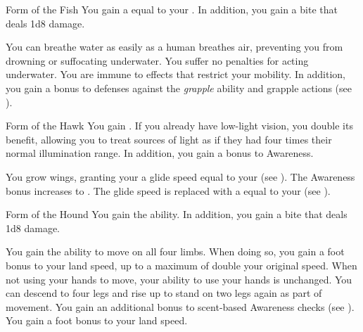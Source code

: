 {            \begin{freeability}{Form of the Fish}
                You gain a  equal to your .
                In addition, you gain a bite  that deals 1d8 damage.

                \rankline
                 You can breathe water as easily as a human breathes air, preventing you from drowning or suffocating underwater.
                 You suffer no penalties for acting underwater.
                 You are immune to  effects that restrict your mobility.
                In addition, you gain a  bonus to defenses against the \textit{grapple} ability and grapple actions (see ).
            \end{freeability}

            \begin{freeability}{Form of the Hawk}
                You gain .
                If you already have low-light vision, you double its benefit, allowing you to treat sources of light as if they had four times their normal illumination range.
                In addition, you gain a  bonus to Awareness.

                \rankline
                 You grow wings, granting your a glide speed equal to your  (see ).
                 The Awareness bonus increases to .
                 The glide speed is replaced with a  equal to your  (see ).
            \end{freeability}

            \begin{freeability}{Form of the Hound}
                You gain the  ability.
                In addition, you gain a bite  that deals 1d8 damage.

                \rankline
                 You gain the ability to move on all four limbs.
                When doing so, you gain a  foot bonus to your land speed, up to a maximum of double your original speed.
                When not using your hands to move, your ability to use your hands is unchanged.
                You can descend to four legs and rise up to stand on two legs again as part of movement.
                 You gain an additional  bonus to scent-based Awareness checks (see ).
                 You gain a  foot bonus to your land speed.
            \end{freeability}

}
